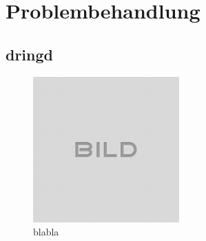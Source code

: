 
\chapter{Problembehandlung}\label{chap.problembehandlung}

\section{dringd}\label{sect.trouble_dring}

\begin{figure}[H]
	\centering
	\includegraphics[width=0.5\textwidth]{images/idle.png}
	\caption{blabla}
	\label{fig.trouble.blublu}
\end{figure}


